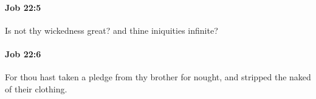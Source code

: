 		\paragraph{Job 22:5} %
			\label{JOB-22-5}

			Is not thy wickedness great? and thine iniquities infinite?


		\paragraph{Job 22:6} %
			\label{JOB-22-6}

			For thou hast taken a pledge from thy brother for nought, and stripped the naked of their clothing.


